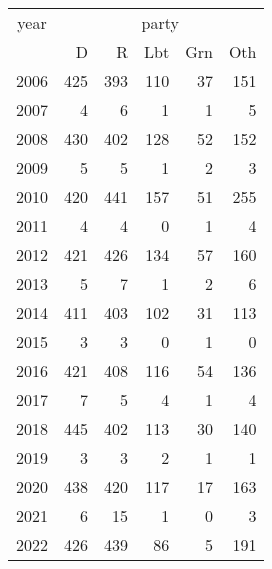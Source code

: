 \footnotesize\begin{tabular}[t]{lrrrrr}
\toprule
\multicolumn{1}{c}{year} & \multicolumn{5}{c}{party} \\
\cmidrule(l{3pt}r{3pt}){1-1} \cmidrule(l{3pt}r{3pt}){2-6}
  & D & R & Lbt & Grn & Oth\\
\midrule
2006 & 425 & 393 & 110 & 37 & 151\\
2007 & 4 & 6 & 1 & 1 & 5\\
2008 & 430 & 402 & 128 & 52 & 152\\
2009 & 5 & 5 & 1 & 2 & 3\\
2010 & 420 & 441 & 157 & 51 & 255\\
2011 & 4 & 4 & 0 & 1 & 4\\
2012 & 421 & 426 & 134 & 57 & 160\\
2013 & 5 & 7 & 1 & 2 & 6\\
2014 & 411 & 403 & 102 & 31 & 113\\
2015 & 3 & 3 & 0 & 1 & 0\\
2016 & 421 & 408 & 116 & 54 & 136\\
2017 & 7 & 5 & 4 & 1 & 4\\
2018 & 445 & 402 & 113 & 30 & 140\\
2019 & 3 & 3 & 2 & 1 & 1\\
2020 & 438 & 420 & 117 & 17 & 163\\
2021 & 6 & 15 & 1 & 0 & 3\\
2022 & 426 & 439 & 86 & 5 & 191\\
\bottomrule
\end{tabular}
